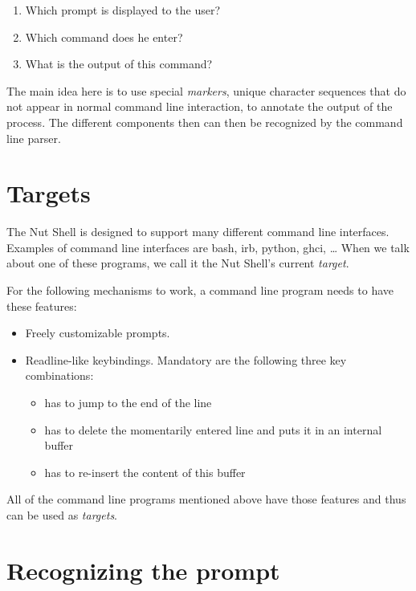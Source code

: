 \documentclass[paper=a4,twoside,abstract=on,cleardoublepage=empty,numbers=noenddot,toc=bib,11pt,appendixprefix=true]{scrreprt}
\begin{document}
\begin{enumerate}
    \item Which prompt is displayed to the user?
    \item Which command does he enter?
    \item What is the output of this command?
\end{enumerate}

The main idea here is to use special \emph{markers}, unique character sequences that do not appear in normal command line interaction, to annotate the output of the process. The different components then can then be recognized by the command line parser.

\section{Targets}
\label{sec:targets}

The Nut Shell is designed to support many different command line interfaces. Examples of command line interfaces are bash, irb, python, ghci, … When we talk about one of these programs, we call it the Nut Shell's current \emph{target}.

For the following mechanisms to work, a command line program needs to have these features:

\begin{itemize}
    \item Freely customizable prompts.
    \item Readline-like keybindings. Mandatory are the following three key combinations:
        \begin{itemize}
            \item {} has to jump to the end of the line

            \item {} has to delete the momentarily entered line and puts it in an internal buffer
            
            \item {} has to re-insert the content of this buffer
        \end{itemize}
\end{itemize}

All of the command line programs mentioned above have those features and thus can be used as \emph{targets}.

\section{Recognizing the prompt}
\end{document}
